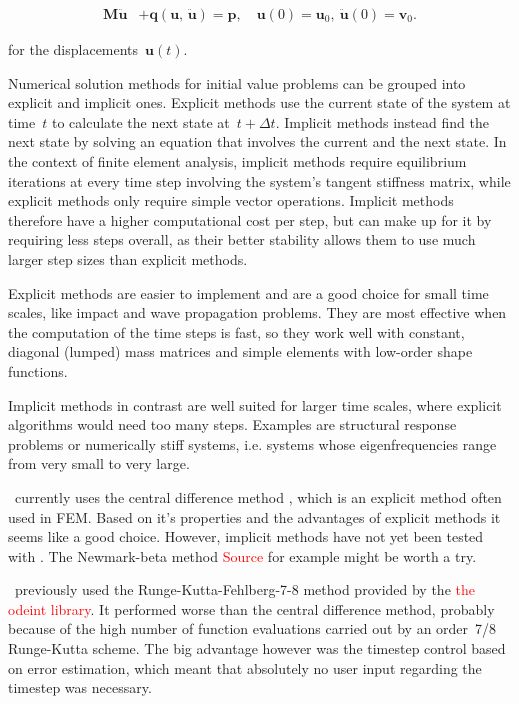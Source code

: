 \begin{align}
\boldsymbol{M}\ddot{\boldsymbol{u}} &+ \boldsymbol{q}(\boldsymbol{u},\,\ddot{\boldsymbol{u}}) = \boldsymbol{p},\quad \boldsymbol{u}(0) = \boldsymbol{u}_0,\ \ddot{\boldsymbol{u}}(0) = \boldsymbol{v}_0.\label{eq:dynamics:system_equation}
\end{align}

for the displacements~$\boldsymbol{u}(t)$.

Numerical solution methods for initial value problems can be grouped into explicit and implicit ones.
Explicit methods use the current state of the system at time~$t$ to calculate the next state at~$t + \Delta t$.
Implicit methods instead find the next state by solving an equation that involves the current and the next state.
In the context of finite element analysis, implicit methods require equilibrium iterations at every time step involving the system's tangent stiffness matrix, while explicit methods only require simple vector operations.
Implicit methods therefore have a higher computational cost per step, but can make up for it by requiring less steps overall, as their better stability allows them to use much larger step sizes than explicit methods.

Explicit methods are easier to implement and are a good choice for small time scales, like impact and wave propagation problems.
They are most effective when the computation of the time steps is fast, so they work well with constant, diagonal (lumped) mass matrices and simple elements with low-order shape functions.

Implicit methods in contrast are well suited for larger time scales, where explicit algorithms would need too many steps.
Examples are structural response problems or numerically stiff systems, i.e. systems whose eigenfrequencies range from very small to very large.

\swtitle\ currently uses the central difference method \cite{bib:dynamic_solution}, which is an explicit method often used in FEM.
Based on it's properties and the advantages of explicit methods it seems like a good choice.
However, implicit methods have not yet been tested with \swtitle. The Newmark-beta method \textcolor{red}{Source} for example might be worth a try.

\swtitle\ previously used the Runge-Kutta-Fehlberg-7-8 method provided by the \textcolor{red}{the odeint library}.
It performed worse than the central difference method, probably because of the high number of function evaluations carried out by an order~7/8 Runge-Kutta scheme.
The big advantage however was the timestep control based on error estimation, which meant that absolutely no user input regarding the timestep was necessary.


